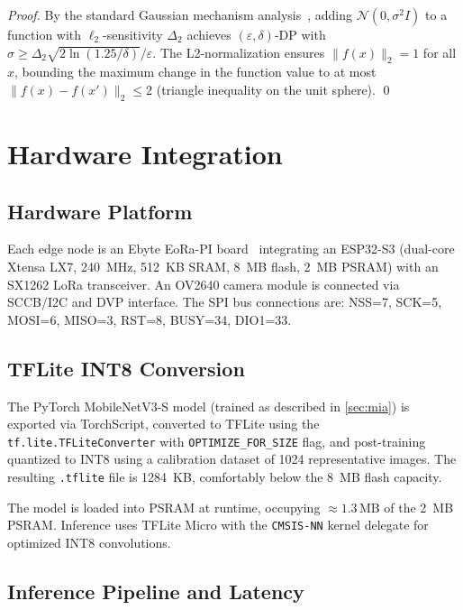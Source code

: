 \documentclass[journal]{IEEEtran}
\newcommand{\eps}{\varepsilon}
\newcommand{\MN}{MobileNetV3-S\xspace}
\begin{document}
\begin{proof}
By the standard Gaussian mechanism analysis~\cite{Dwork2014},
adding $\mathcal{N}(0,\sigma^2 I)$ to a function with $\ell_2$-sensitivity
$\Delta_2$ achieves $(\eps,\delta)$-DP with
$\sigma \geq \Delta_2\sqrt{2\ln(1.25/\delta)}/\eps$.
The L2-normalization ensures $\|f(x)\|_2 = 1$ for all $x$,
bounding the maximum change in the function value to at most
$\|f(x) - f(x')\|_2 \leq 2$ (triangle inequality on the unit sphere).
\qed
\end{proof}

\section{Hardware Integration}
\label{sec:hardware}

\subsection{Hardware Platform}

Each edge node is an Ebyte EoRa-PI board~\cite{LoRaMesher2023}
integrating an ESP32-S3 (dual-core Xtensa LX7, \SI{240}{MHz},
\SI{512}{KB} SRAM, \SI{8}{MB} flash, \SI{2}{MB} PSRAM) with an
SX1262 LoRa transceiver.
An OV2640 camera module is connected via SCCB/I2C and DVP interface.
The SPI bus connections are: NSS=7, SCK=5, MOSI=6, MISO=3, RST=8,
BUSY=34, DIO1=33.

\subsection{TFLite INT8 Conversion}

The PyTorch \MN model (trained as described in \cref{sec:mia}) is
exported via TorchScript, converted to TFLite using the
\texttt{tf.lite.TFLiteConverter} with \texttt{OPTIMIZE\_FOR\_SIZE}
flag, and post-training quantized to INT8 using a calibration dataset
of 1024 representative images.
The resulting \texttt{.tflite} file is \SI{1284}{KB}, comfortably
below the \SI{8}{MB} flash capacity.

The model is loaded into PSRAM at runtime, occupying $\approx 1.3$\,MB
of the \SI{2}{MB} PSRAM.
Inference uses TFLite Micro with the \texttt{CMSIS-NN} kernel
delegate for optimized INT8 convolutions.

\subsection{Inference Pipeline and Latency}
\end{document}
